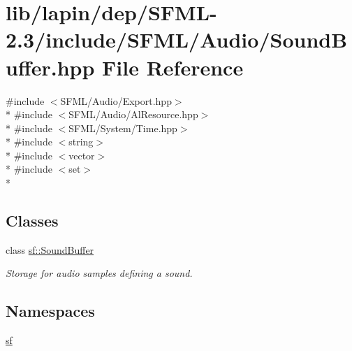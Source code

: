 \hypertarget{lapin_2dep_2_s_f_m_l-2_83_2include_2_s_f_m_l_2_audio_2_sound_buffer_8hpp}{\section{lib/lapin/dep/\-S\-F\-M\-L-\/2.3/include/\-S\-F\-M\-L/\-Audio/\-Sound\-Buffer.hpp File Reference}
\label{lapin_2dep_2_s_f_m_l-2_83_2include_2_s_f_m_l_2_audio_2_sound_buffer_8hpp}
}
{\ttfamily \#include $<$S\-F\-M\-L/\-Audio/\-Export.\-hpp$>$}\\*
{\ttfamily \#include $<$S\-F\-M\-L/\-Audio/\-Al\-Resource.\-hpp$>$}\\*
{\ttfamily \#include $<$S\-F\-M\-L/\-System/\-Time.\-hpp$>$}\\*
{\ttfamily \#include $<$string$>$}\\*
{\ttfamily \#include $<$vector$>$}\\*
{\ttfamily \#include $<$set$>$}\\*
\subsection*{Classes}
\begin{DoxyCompactItemize}
\item 
class \hyperlink{classsf_1_1_sound_buffer}{sf\-::\-Sound\-Buffer}
\begin{DoxyCompactList}\small\item\em Storage for audio samples defining a sound. \end{DoxyCompactList}\end{DoxyCompactItemize}
\subsection*{Namespaces}
\begin{DoxyCompactItemize}
\item 
\hyperlink{namespacesf}{sf}
\end{DoxyCompactItemize}
